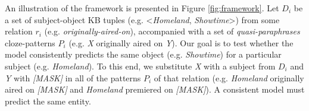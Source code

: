 

An illustration of the framework is presented in Figure \ref{fig:framework}.
Let $D_i$ be a set of subject-object KB tuples (e.g. <\textit{Homeland}, \textit{Showtime}>) from some relation $r_i$ (e.g. \textit{originally-aired-on}), accompanied with a set of \textit{quasi-paraphrases} cloze-patterns $P_i$ (e.g. \textit{X} originally aired on \textit{Y}).
Our goal is to test whether the model consistently predicts the same object (e.g. \textit{Showtime}) for a particular subject (e.g. \textit{Homeland}). To this end, we substitute \textit{X} with a subject from $D_i$ and \textit{Y} with \textit{[MASK]} in all of the patterns $P_i$ of that relation (e.g. \textit{Homeland} originally aired on \textit{[MASK]} and \textit{Homeland} premiered on \textit{[MASK]}).
A consistent model must predict the same entity. 













